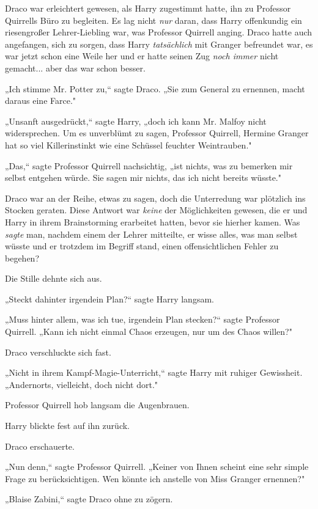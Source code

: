 {Draco war erleichtert gewesen, als Harry zugestimmt hatte, ihn zu Professor Quirrells Büro zu begleiten. Es lag nicht \emph{nur} daran, dass Harry offenkundig ein riesengroßer Lehrer-Liebling war, was Professor Quirrell anging. Draco hatte auch angefangen, sich zu sorgen, dass Harry \emph{tatsächlich} mit Granger befreundet war, es war jetzt schon eine Weile her und er hatte seinen Zug \emph{noch immer} nicht gemacht... aber das war schon besser.

„Ich stimme Mr. Potter zu,“ sagte Draco. „Sie zum General zu ernennen, macht daraus eine Farce."

„Unsanft ausgedrückt,“ sagte Harry, „doch ich kann Mr. Malfoy nicht widersprechen. Um es unverblümt zu sagen, Professor Quirrell, Hermine Granger hat so viel Killerinstinkt wie eine Schüssel feuchter Weintrauben."

„Das,“ sagte Professor Quirrell nachsichtig, „ist nichts, was zu bemerken mir selbst entgehen würde. Sie sagen mir nichts, das ich nicht bereits wüsste."

Draco war an der Reihe, etwas zu sagen, doch die Unterredung war plötzlich ins Stocken geraten. Diese Antwort war \emph{keine} der Möglichkeiten gewesen, die er und Harry in ihrem Brainstorming erarbeitet hatten, bevor sie hierher kamen. Was \emph{sagte} man, nachdem einem der Lehrer mitteilte, er wisse alles, was man selbst wüsste und er trotzdem im Begriff stand, einen offensichtlichen Fehler zu begehen?

Die Stille dehnte sich aus.

„Steckt dahinter irgendein Plan?“ sagte Harry langsam.

„Muss hinter allem, was ich tue, irgendein Plan stecken?“ sagte Professor Quirrell. „Kann ich nicht einmal Chaos erzeugen, nur um des Chaos willen?"

Draco verschluckte sich fast.

„Nicht in ihrem Kampf-Magie-Unterricht,“ sagte Harry mit ruhiger Gewissheit. „Andernorts, vielleicht, doch nicht dort."

Professor Quirrell hob langsam die Augenbrauen.

Harry blickte fest auf ihn zurück.

Draco erschauerte.

„Nun denn,“ sagte Professor Quirrell. „Keiner von Ihnen scheint eine sehr simple Frage zu berücksichtigen. Wen könnte ich anstelle von Miss Granger ernennen?"

„Blaise Zabini,“ sagte Draco ohne zu zögern.

}
